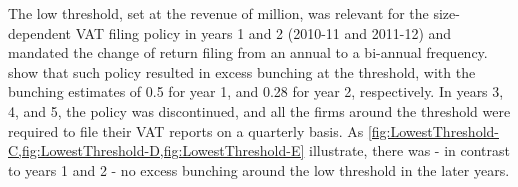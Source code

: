 The low threshold, set at the revenue of  million, was relevant for the size-dependent VAT filing policy in years 1 and 2 (2010-11 and 2011-12) and mandated the change of return filing from an annual to a bi-annual frequency.  show that such policy resulted in excess bunching at the threshold, with the bunching estimates of 0.5 for year 1, and 0.28 for year 2, respectively. In years 3, 4, and 5, the policy was discontinued, and all the firms around the threshold were required to file their VAT reports on a quarterly basis. As \cref{fig:LowestThreshold-C,fig:LowestThreshold-D,fig:LowestThreshold-E} illustrate, there was - in contrast to years 1 and 2 - no excess bunching around the low threshold in the later years.

\begin{figure}[t!]
  \centering
  \hspace{0mm}
\end{figure}
